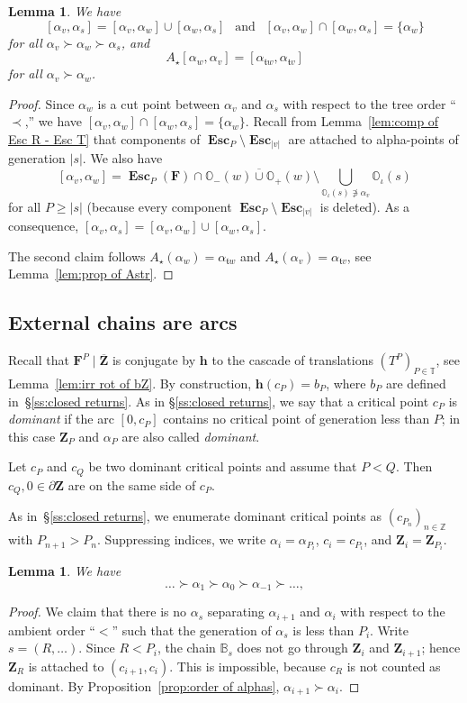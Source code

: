 \documentclass{amsart}
\renewcommand{\sp}{{\ \ }}
\newcommand{\1}{{\mathbb 1 }}
\newcommand\PT{\mathbb{ T}}
\newcommand{\bB}{{\mathbb{B}}}
\newcommand{\bO}{{\mathbb{O}}}
\newcommand{\bF}{{\mathbf F}}
\newcommand{\bZ}{{\mathbf Z}}
\newcommand{\bbh}{{\mathbf h}}
\newcommand{\str}{{\star}}
\renewcommand{\tt}{\mathfrak{t}}
\newcommand{\Z}{\mathbb{Z}}
\newtheorem{lem}[thm]{Lemma}
\theoremstyle{remark}
\numberwithin{equation}{section}
\theoremstyle{definition}
\newcommand{\Esc}{{\boldsymbol{\operatorname{Esc}}}}
\theoremstyle{nonumberbreak}
\begin{document}
\begin{lem}
\label{lem:conc of chains}
We have 
\[ [\alpha_v,\alpha_s]=[\alpha_v,\alpha_w] \cup [\alpha_w,\alpha_s]\sp \text{ and }\sp [\alpha_v,\alpha_w] \cap [\alpha_w,\alpha_s]=\{\alpha_w\}\]
for all $\alpha_v\succ \alpha_w\succ \alpha_s$, and
\[A_\str[\alpha_w,\alpha_v]= [\alpha_{\tt w }, \alpha_{\tt v}]\]
for all $\alpha_v\succ \alpha_w$.
\end{lem}
\begin{proof}
Since $\alpha_w$ is a cut point between $\alpha_v$ and $\alpha_s$ with respect to the tree order ``$\prec$,'' we have $[\alpha_v,\alpha_w] \cap [\alpha_w,\alpha_s]=\{\alpha_w\}$. Recall from  Lemma~\ref{lem:comp of Esc R - Esc T} that components of $\Esc_P\setminus \Esc_{|v|}$ are attached to alpha-points of generation $|s|$. We also have 
\[ [\alpha_v,\alpha_w]=\Esc_{P}(\bF)\cap \overline{ \bO_-(w)\cup \bO_+(w)} \setminus \bigcup_{\bO_\iota(s)\not\ni \alpha_v}  \bO_\iota(s)\]
for all $P\ge |s|$ (because every component $\Esc_P\setminus \Esc_{|v|}$ is deleted). As a consequence,
$[\alpha_v,\alpha_s]=[\alpha_v,\alpha_w] \cup [\alpha_w,\alpha_s]$.


The second claim follows $A_\str(\alpha_w)=\alpha_{\tt w}$ and $A_\str(\alpha_v)=\alpha_{\tt v}$, see Lemma~\ref{lem:prop of Astr}.
\end{proof}




\subsection{External chains are arcs}
\label{ss:ExtChainsAreArcs}
Recall that $\bF^P\mid \overline \bZ$ is conjugate by $\bbh$ to the cascade of translations $(T^P)_{P\in \PT}$, see Lemma~\ref{lem:irr rot of bZ}. By construction, $\bbh(c_P)= b_P$, where $b_P$ are defined in~\S\ref{ss:closed returns}. As in \S\ref{ss:closed returns}, we say that a critical point $c_{P}$ is \emph{dominant} if the arc $[0,c_P]$ contains no critical point of generation less than $P$; in this case $\bZ_P$ and $\alpha_P$ are also called  \emph{dominant}.  

Let $c_P$ and $c_Q$ be two dominant critical points and assume that $P<Q$. Then $c_Q,0\in \partial \bZ$ are on the same side of $c_P$. 

As in~\S\ref{ss:closed returns}, we enumerate dominant critical points as $(c_{P_n})_{n\in \Z}$ with $P_{n+1}>P_{n}$. Suppressing indices, we write $\alpha_i=\alpha_{P_i}$, $c_i=c_{P_i}$, and $\bZ_i=\bZ_{P_i}$. 
\begin{lem}
We have
\[\dots \succ\alpha_{1} \succ\alpha_{0} \succ\alpha_{-1}\succ\dots , \]
\end{lem}
\begin{proof}
We claim that there is no $\alpha_s$ separating $\alpha_{i+1}$ and $ \alpha_{i}$ with respect to the ambient order ``$<$'' such that the generation of $\alpha_s$ is less than $P_i$. Write $s=(R,\dots )$. Since $R<P_i$, the chain $\bB_s$ does not go through $\bZ_{i}$ and $\bZ_{i+1}$; hence $\bZ_R$ is attached to $ (c_{i+1},c_i)$. This is impossible, because $c_R$ is not counted as dominant. By Proposition~\ref{prop:order of alphas},  $\alpha_{i+1}\succ\alpha_i$.
\end{proof}
\end{document}
